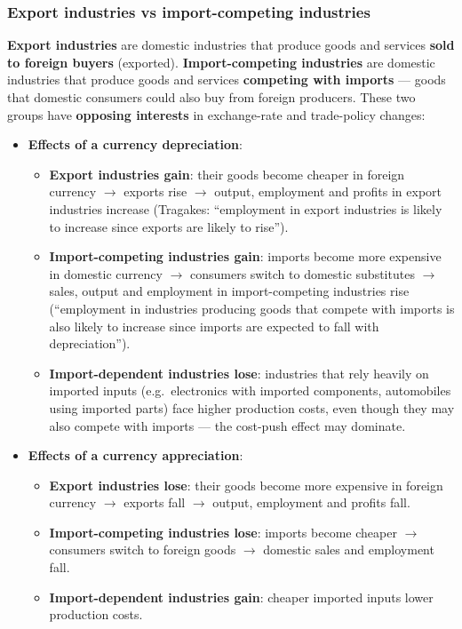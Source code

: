 \documentclass[a4paper,12pt]{article}
\newcommand{\needbold}[1]{\textcolor{red!70!black}{\textbf{#1}}}
\begin{document}
\subsubsection*{Export industries vs import-competing industries}
\needbold{Export industries} are domestic industries that produce goods and services \textbf{sold to foreign buyers} (exported). \needbold{Import-competing industries} are domestic industries that produce goods and services \textbf{competing with imports} --- goods that domestic consumers could also buy from foreign producers. These two groups have \textbf{opposing interests} in exchange-rate and trade-policy changes:
\begin{itemize}
  \item \textbf{Effects of a currency depreciation}:
  \begin{itemize}
    \item \textbf{Export industries gain}: their goods become cheaper in foreign currency $\to$ exports rise $\to$ output, employment and profits in export industries increase (Tragakes: ``employment in export industries is likely to increase since exports are likely to rise'').
    \item \textbf{Import-competing industries gain}: imports become more expensive in domestic currency $\to$ consumers switch to domestic substitutes $\to$ sales, output and employment in import-competing industries rise (``employment in industries producing goods that compete with imports is also likely to increase since imports are expected to fall with depreciation'').
    \item \textbf{Import-dependent industries lose}: industries that rely heavily on imported inputs (e.g.\ electronics with imported components, automobiles using imported parts) face higher production costs, even though they may also compete with imports --- the cost-push effect may dominate.
  \end{itemize}
  \item \textbf{Effects of a currency appreciation}:
  \begin{itemize}
    \item \textbf{Export industries lose}: their goods become more expensive in foreign currency $\to$ exports fall $\to$ output, employment and profits fall.
    \item \textbf{Import-competing industries lose}: imports become cheaper $\to$ consumers switch to foreign goods $\to$ domestic sales and employment fall.
    \item \textbf{Import-dependent industries gain}: cheaper imported inputs lower production costs.

\end{itemize}
\end{itemize}
\end{document}

